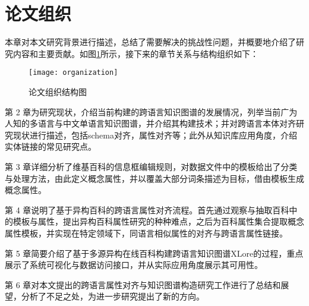 \section{论文组织}

本章对本文研究背景进行描述，总结了需要解决的挑战性问题，并概要地介绍了研究内容和主要贡献。如图\ref{fig:organization}所示，接下来的章节关系与结构组织如下：

\begin{figure}[ht] 
  \centering
  \texttt{[image: organization]}
  \caption{论文组织结构图}
  \label{fig:organization}
\end{figure}

第 2 章为研究现状，介绍当前构建的跨语言知识图谱的发展情况，列举当前广为人知的多语言与中文单语言知识图谱，并介绍其构建技术；并对跨语言本体对齐研究现状进行描述，包括schema对齐，属性对齐等；此外从知识库应用角度，介绍实体链接的常见研究点。

第 3 章详细分析了维基百科的信息框编辑规则，对数据文件中的模板给出了分类与处理方法，由此定义概念属性，并以覆盖大部分词条描述为目标，借由模板生成概念属性。

第 4 章说明了基于异构百科的跨语言属性对齐流程。首先通过观察与抽取百科中的模板与属性，提出异构百科属性研究的种种难点，之后为百科属性集合提取概念属性模板，并实现在特定领域下，同语言相似属性的对齐与跨语言属性链接。

第 5 章简要介绍了基于多源异构在线百科构建跨语言知识图谱XLore的过程，重点展示了系统可视化与数据访问接口，并从实际应用角度展示其可用性。

第 6 章对本文提出的跨语言属性对齐与知识图谱构造研究工作进行了总结和展望，分析了不足之处，为进一步研究提出了新的方向。

